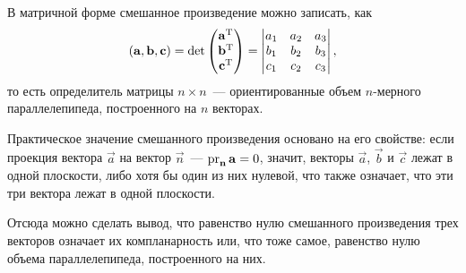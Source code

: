 В матричной форме смешанное произведение можно записать, как
\begin{equation}
	\left( \mathbf{a}, \mathbf{b}, \mathbf{c} \right) = \det
	\begin{pmatrix}
		\mathbf{a}^{\operatorname{T}}\\
		\mathbf{b}^{\operatorname{T}}\\
		\mathbf{c}^{\operatorname{T}}
	\end{pmatrix} =
	\begin{vmatrix}
		a_1 & a_2 & a_3\\
		b_1 & b_2 & b_3\\
		c_1 & c_2 & c_3
	\end{vmatrix},
\end{equation}
то есть определитель матрицы $n \times n$~--- ориентированные объем $n$-мерного параллелепипеда, построенного на $n$ векторах.

Практическое значение смешанного произведения основано на его свойстве: если проекция вектора $\vec{a}$ на вектор $\vec{n}$~--- $\operatorname{pr}_{\mathbf{n}} \mathbf{a} = 0$, значит, векторы $\vec{a}$, $\vec{b}$ и $\vec{c}$ лежат в одной плоскости, либо хотя бы один из них нулевой, что также означает, что эти три вектора лежат в одной плоскости.

Отсюда можно сделать вывод, что равенство нулю смешанного произведения трех векторов означает их компланарность или, что тоже самое, равенство нулю объема параллелепипеда, построенного на них.
